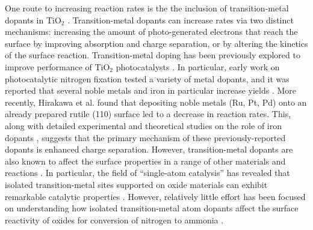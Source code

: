 One route to increasing reaction rates is the the inclusion of transition\hyp{}metal dopants in TiO$_2$ \cite{Zaleska_2008}.  Transition\hyp{}metal dopants can increase rates via two distinct mechanisms: increasing the amount of photo-generated electrons that reach the surface by improving absorption and charge separation, or by altering the kinetics of the surface reaction.
Transition-metal doping has been previously explored to improve performance of TiO$_2$ photocatalysts \cite{Schneider_2014, Li_2007, Dozzi_2013}. In particular, early work on photocatalytic nitrogen fixation tested a variety of metal dopants, and it was reported that several noble metals \cite{Ranjit_1996} and iron in particular increase yields \cite{Schrauzer_1977,Schrauzer_1983, Augugliaro_1982,Soria_1991, Ranjit_1996,Ranjit_1997}. More recently, Hirakawa et al. found that depositing noble metals (Ru, Pt, Pd) onto an already prepared rutile (110) surface led to a decrease in reaction rates.\cite{Hirakawa_2017} This, along with detailed experimental and theoretical studies on the role of iron dopants ,\cite{Soria_1991, Comer_2018} suggests that the primary mechanism of these previously-reported dopants is enhanced charge separation. However, transition-metal dopants are also known to affect the surface properties in a range of other materials and reactions \cite{Khan_2018,Gu_2014, Ammal_2016, Gu_2017,Comer_2018, Garc_a_Mota_2011, Yao_2017}. In particular, the field of ``single-atom catalysis'' has revealed that isolated transition-metal sites supported on oxide materials can exhibit remarkable catalytic properties \cite{Liu_2016, Qiao_2011, O_Connor_2018}. However, relatively little effort has been focused on understanding how isolated transition-metal atom dopants affect the surface reactivity of oxides for conversion of nitrogen to ammonia \cite{Tao_2019, Liu_2019, Zhao_2019, Cheng_2019, Li_2017}.


